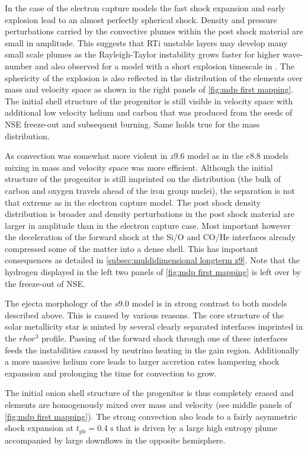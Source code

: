 \documentclass[fleqn,usenatbib]{mnras}
\newcommand{\tpb}{\ensuremath{t_{\text{pb}}}}
\renewcommand{\sec}{\xspace\ensuremath{\mathrm{s}}}
\begin{document}
In the case of the electron capture models the fast shock expansion and early explosion lead to an almost perfectly spherical shock. Density and pressure perturbations carried by the convective plumes within the post shock material are small in amplitude. 
This suggests that RTi unstable layers may develop many small scale plumes as the Rayleigh-Taylor instability grows faster for higher wave-number \cite{Gupta1986,Guilet2009} and also observed for a model with a short explosion timescale in \cite{Kifonidis2003}.
The sphericity of the explosion is also reflected in the distribution of the elements over mass and velocity space as shown in the right panels of \autoref{fig:mdp first mapping}. The initial shell structure of the progenitor is still visible in velocity space with additional low velocity helium and carbon that was produced from the seeds of NSE freeze-out and subsequent burning. Same holds true for the mass distribution. 

As convection was somewhat more violent in $z9.6$ model as in the $e8.8$ models mixing in mass and velocity space was more efficient. Although the initial structure of the progenitor is still imprinted on the distribution (the bulk of carbon and oxygen travels ahead of the iron group nuclei), the separation is not that extreme as in the electron capture model. The post shock density distribution is broader and density perturbations in the post shock material are larger in amplitude than in the electron capture case. Most important however the deceleration of the forward shock at the Si/O and CO/He interfaces already compressed some of the matter into a dense shell. This has important consequences as detailed in \autoref{subsec:muldidimensional longterm z9}.
Note that the hydrogen displayed in the left two panels of \autoref{fig:mdp first mapping} is left over by the freeze-out of NSE. 

The ejecta morphology of the  $s9.0$ model is in strong contrast to both models described above. This is caused by various reasons. 
The core structure of the solar metallicity star is minted by several clearly separated interfaces imprinted in the $rho r^3$ profile. Passing of the forward shock through one of these interfaces feeds the instabilities caused by neutrino heating in the gain region.
Additionally a more massive helium core leads to larger accretion rates hampering shock expansion and prolonging the time for convection to grow.

The initial onion shell structure of the progenitor is thus completely erased and elements are homogenously mixed over mass and velocity (see middle panels of \autoref{fig:mdp first mapping}).
The strong convection also leads to a fairly asymmetric shock expansion at $\tpb=0.4\;\sec$ that is driven by a large high entropy plume accompanied by large downflows in the opposite hemisphere. 
\end{document}
